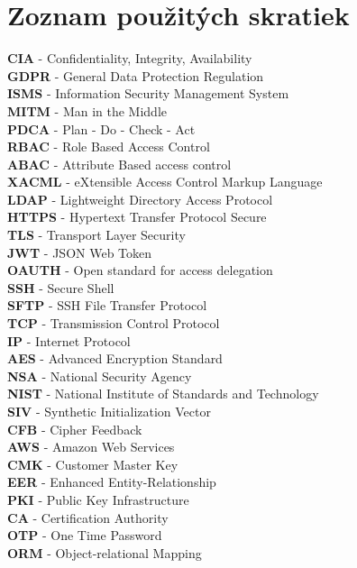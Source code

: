 
\chapter*{Zoznam použitých skratiek}\label{ch:zoznam-pouzitych-skratiek}

\textbf{CIA}   - Confidentiality, Integrity, Availability \\
\textbf{GDPR}  - General Data Protection Regulation \\
\textbf{ISMS}  - Information Security Management System \\
\textbf{MITM}  - Man in the Middle\\
\textbf{PDCA}  - Plan - Do - Check - Act\\
\textbf{RBAC}  - Role Based Access Control\\
\textbf{ABAC}  - Attribute Based access control\\
\textbf{XACML} - eXtensible Access Control Markup Language\\
\textbf{LDAP}  - Lightweight Directory Access Protocol\\
\textbf{HTTPS} - Hypertext Transfer Protocol Secure\\
\textbf{TLS}   - Transport Layer Security\\
\textbf{JWT}   - JSON Web Token\\
\textbf{OAUTH} - Open standard for access delegation\\
\textbf{SSH}   - Secure Shell\\
\textbf{SFTP}  - SSH File Transfer Protocol\\
\textbf{TCP}   - Transmission Control Protocol\\
\textbf{IP}    - Internet Protocol\\
\textbf{AES}   - Advanced Encryption Standard\\
\textbf{NSA}   - National Security Agency\\
\textbf{NIST}  - National Institute of Standards and Technology\\
\textbf{SIV}   - Synthetic Initialization Vector\\
\textbf{CFB}   - Cipher Feedback\\
\textbf{AWS}   - Amazon Web Services\\
\textbf{CMK}   - Customer Master Key\\
\textbf{EER}   - Enhanced Entity-Relationship\\
\textbf{PKI}   - Public Key Infrastructure\\
\textbf{CA}    - Certification Authority\\
\textbf{OTP}   - One Time Password\\
\textbf{ORM}   - Object-relational Mapping\\
